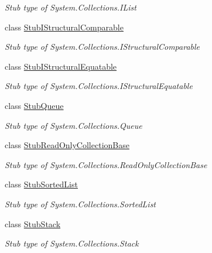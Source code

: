 \begin{DoxyCompactItemize}
\begin{DoxyCompactList}\small\item\em Stub type of System.\-Collections.\-I\-List\end{DoxyCompactList}\item 
class \hyperlink{class_system_1_1_collections_1_1_fakes_1_1_stub_i_structural_comparable}{Stub\-I\-Structural\-Comparable}
\begin{DoxyCompactList}\small\item\em Stub type of System.\-Collections.\-I\-Structural\-Comparable\end{DoxyCompactList}\item 
class \hyperlink{class_system_1_1_collections_1_1_fakes_1_1_stub_i_structural_equatable}{Stub\-I\-Structural\-Equatable}
\begin{DoxyCompactList}\small\item\em Stub type of System.\-Collections.\-I\-Structural\-Equatable\end{DoxyCompactList}\item 
class \hyperlink{class_system_1_1_collections_1_1_fakes_1_1_stub_queue}{Stub\-Queue}
\begin{DoxyCompactList}\small\item\em Stub type of System.\-Collections.\-Queue\end{DoxyCompactList}\item 
class \hyperlink{class_system_1_1_collections_1_1_fakes_1_1_stub_read_only_collection_base}{Stub\-Read\-Only\-Collection\-Base}
\begin{DoxyCompactList}\small\item\em Stub type of System.\-Collections.\-Read\-Only\-Collection\-Base\end{DoxyCompactList}\item 
class \hyperlink{class_system_1_1_collections_1_1_fakes_1_1_stub_sorted_list}{Stub\-Sorted\-List}
\begin{DoxyCompactList}\small\item\em Stub type of System.\-Collections.\-Sorted\-List\end{DoxyCompactList}\item 
class \hyperlink{class_system_1_1_collections_1_1_fakes_1_1_stub_stack}{Stub\-Stack}
\begin{DoxyCompactList}\small\item\em Stub type of System.\-Collections.\-Stack\end{DoxyCompactList}\end{DoxyCompactItemize}
